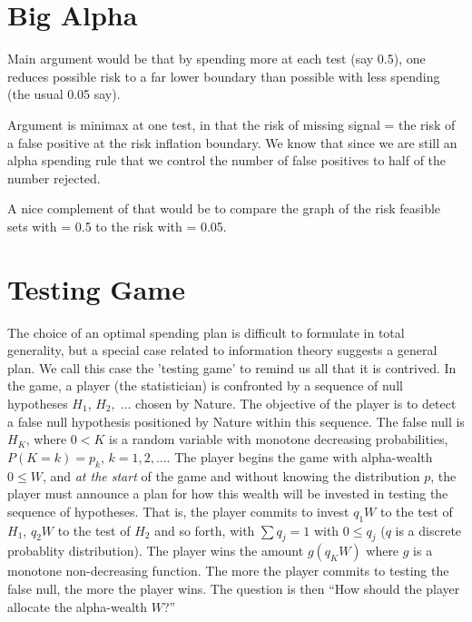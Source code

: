\documentclass[12pt]{article}
\begin{document}
\section{Big Alpha}

Main argument would be that by spending more at each test (say 0.5), one reduces
possible risk to a far lower boundary than possible with less spending (the
usual 0.05 say).  

Argument is minimax at one test, in that the risk of missing signal = the risk
of a false positive at the risk inflation boundary.  We know that since we are
still an alpha spending rule that we control the number of false positives to
half of the number rejected.

A nice complement of that would be to compare the graph of the risk feasible
 sets with \omega = 0.5 to the risk with \omega = 0.05.


\section{Testing Game}

 The choice of an optimal spending plan is difficult to formulate in total
 generality, but a special case related to information theory suggests a general
 plan.  We call this case the 'testing game' to remind us all that it is
 contrived.  In the game, a player (the statistician) is confronted by a
 sequence of null hypotheses $H_1$, $H_2, \; \ldots$ chosen by Nature.  The
 objective of the player is to detect a false null hypothesis positioned by
 Nature within this sequence.  The false null is $H_K$, where $0 < K$ is a
 random variable with monotone decreasing probabilities, $P(K=k)=p_k, \,
 k=1,2,\ldots$.  The player begins the game with alpha-wealth $0 \le W$, and
 {\em at the start} of the game and without knowing the distribution $p$, the
 player must announce a plan for how this wealth will be invested in testing the
 sequence of hypotheses.  That is, the player commits to invest $q_1W$ to the
 test of $H_1$, $q_2W$ to the test of $H_2$ and so forth, with $\sum q_j = 1$
 with $0 \le q_j$ ($q$ is a discrete probablity distribution). The player wins
 the amount $g(q_K W)$ where $g$ is a monotone non-decreasing function.  The
 more the player commits to testing the false null, the more the player wins.
  The question is then ``How should the player allocate the alpha-wealth $W$?''
\end{document}
